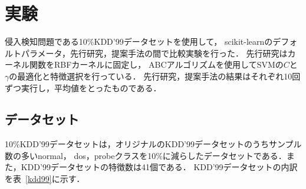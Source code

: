\section{実験}
侵入検知問題である10\%KDD'99データセットを使用して，
scikit-learnのデフォルトパラメータ，先行研究，提案手法の間で比較実験を行った．
先行研究はカーネル関数をRBFカーネルに固定し，
ABCアルゴリズムを使用してSVMの$C$と$\gamma$の最適化と特徴選択を行っている\cite{origin}．
先行研究，提案手法の結果はそれぞれ10回ずつ実行し，平均値をとったものである．
\subsection{データセット}
10\%KDD'99データセットは，オリジナルのKDD'99データセットのうちサンプル数の多いnormal，
dos，probeクラスを10\%に減らしたデータセットである．また，KDD'99データセットの特徴数は41個である．
KDD'99データセットの内訳を表~\ref{kdd99}に示す．
